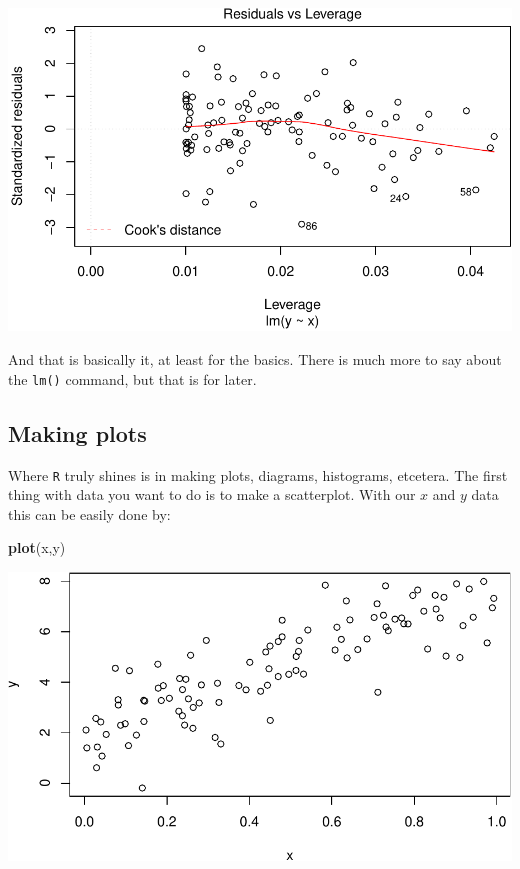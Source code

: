 \documentclass[]{article}
\newenvironment{Shaded}{\begin{snugshade}}{\end{snugshade}}
\newcommand{\KeywordTok}[1]{\textcolor[rgb]{0.13,0.29,0.53}{\textbf{{#1}}}}
\newcommand{\NormalTok}[1]{{#1}}
\begin{document}
\includegraphics{./unnamed-chunk-23-4.pdf}

And that is basically it, at least for the basics. There is much more to
say about the \texttt{lm()} command, but that is for later.

\subsection{Making plots}\label{making-plots}

Where \texttt{R} truly shines is in making plots, diagrams, histograms,
etcetera. The first thing with data you want to do is to make a
scatterplot. With our \(x\) and \(y\) data this can be easily done by:

\begin{Shaded}
\begin{Highlighting}[]
\KeywordTok{plot}\NormalTok{(x,y)}
\end{Highlighting}
\end{Shaded}

\includegraphics{./unnamed-chunk-24-1.pdf}
\end{document}
